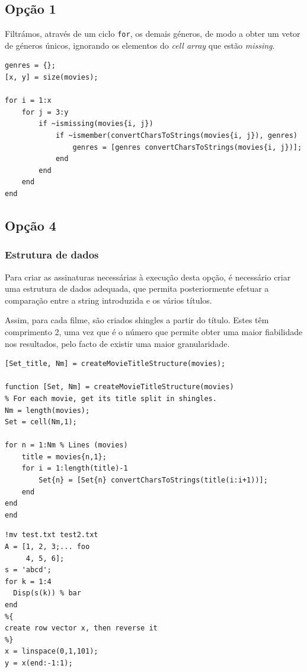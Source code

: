 \documentclass[portuguese, 11pt, a4paper,titlepage, oneside]{article}
\begin{document}
\subsection{Opção 1}
Filtrámos, através de um ciclo \verb|for|, os demais géneros, de modo a obter um vetor de géneros únicos, ignorando os elementos do \textit{cell array} que estão \textit{missing}.

\begin{lstlisting}[style=Matlab-editor]
genres = {};
[x, y] = size(movies);

for i = 1:x
    for j = 3:y
        if ~ismissing(movies{i, j})
            if ~ismember(convertCharsToStrings(movies{i, j}), genres)
                genres = [genres convertCharsToStrings(movies{i, j})];
            end
        end
    end
end
\end{lstlisting}

\subsection{Opção 4}
\subsubsection{Estrutura de dados}
Para criar as assinaturas necessárias à execução desta opção, é necessário criar uma estrutura de dados adequada, que permita posteriormente efetuar a comparação entre a string introduzida e os vários títulos.

Assim, para cada filme, são criados shingles a partir do título. Estes têm comprimento 2, uma vez que é o número que permite obter uma maior fiabilidade nos resultados, pelo facto de existir uma maior granularidade.

\begin{lstlisting}[style=Matlab-editor]
[Set_title, Nm] = createMovieTitleStructure(movies);

function [Set, Nm] = createMovieTitleStructure(movies)
% For each movie, get its title split in shingles.
Nm = length(movies);
Set = cell(Nm,1);

for n = 1:Nm % Lines (movies)
    title = movies{n,1};
    for i = 1:length(title)-1
        Set{n} = [Set{n} convertCharsToStrings(title(i:i+1))];
    end
end
end
\end{lstlisting}

\begin{lstlisting}[style=Matlab-editor]
%% Sample Matlab code
!mv test.txt test2.txt
A = [1, 2, 3;... foo
     4, 5, 6];
s = 'abcd';
for k = 1:4
  Disp(s(k)) % bar
end
%{
create row vector x, then reverse it
%}
x = linspace(0,1,101);
y = x(end:-1:1);
\end{lstlisting}
\end{document}
